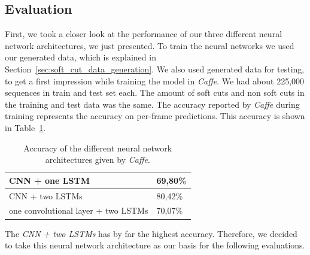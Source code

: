 \subsection{Evaluation}
\label{sec:soft_cut_evaluation}

First, we took a closer look at the performance of our three different neural network architectures, we just presented.
To train the neural networks we used our generated data, which is explained in Section~\ref{sec:soft_cut_data_generation}.
We also used generated data for testing, to get a first impression while training the model in \textit{Caffe}.
We had about 225,000 sequences in train and test set each.
The amount of soft cuts and non soft cuts in the training and test data was the same.
The accuracy reported by \textit{Caffe} during training represents the accuracy on per-frame predictions.
This accuracy is shown in Table~\ref{tab:caffe_accuracy}.
\begin{table}[ht]
	\centering
	\begin{tabular}{l|l}
	CNN + one LSTM                      & 69,80\% \\ \hline
	CNN + two LSTMs                     & 80,42\% \\ \hline
	one convolutional layer + two LSTMs & 70,07\% \\
	\end{tabular}
	\caption{Accuracy of the different neural network architectures given by \textit{Caffe}.}
	\label{tab:caffe_accuracy}
\end{table}
The \textit{CNN + two LSTMs} has by far the highest accuracy.
Therefore, we decided to take this neural network architecture as our basis for the following evaluations.

